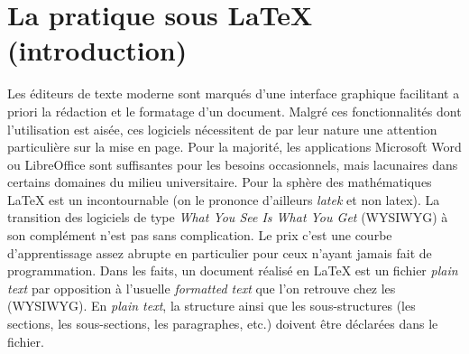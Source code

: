 \twocolumn
	\section*{La pratique sous \LaTeX{} (introduction)}
	Les éditeurs de texte \og moderne\fg{} sont marqués d'une interface graphique facilitant a priori la rédaction et le formatage d'un document. Malgré ces fonctionnalités dont l'utilisation est aisée, ces logiciels nécessitent de par leur nature une attention particulière sur la mise en page. Pour la majorité, les applications Microsoft Word ou LibreOffice sont suffisantes pour les besoins occasionnels, mais lacunaires dans certains domaines du milieu universitaire. Pour la sphère des mathématiques \LaTeX{} est un incontournable (on le prononce d'ailleurs \og \textit{latek}\fg{} et non latex). La transition des logiciels de type \emph{What You See Is What You Get} (WYSIWYG) à son complément n'est pas sans complication. Le prix c'est une courbe d'apprentissage assez abrupte en particulier pour ceux n'ayant jamais fait de programmation. Dans les faits, un document réalisé en \LaTeX{} est un fichier \emph{plain text} par opposition à l'usuelle \emph{formatted text} que l'on retrouve chez les (WYSIWYG). En \emph{plain text}, la structure ainsi que les sous-structures (les sections, les sous-sections, les paragraphes, etc.) doivent être déclarées dans le fichier.	
